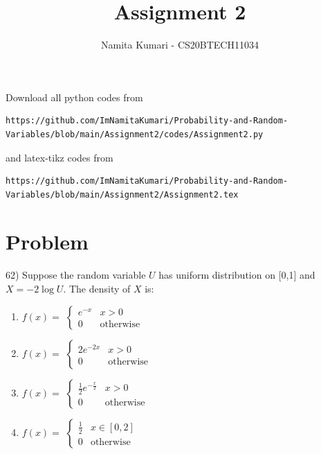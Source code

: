 \documentclass[journal,12pt,twocolumn]{IEEEtran}
\begin{document}
\makeatletter
{}
\makeatother
\let\StandardTheFigure\thefigure
\let\vec\mathbf
\renewcommand{\thefigure}{\theproblem}
\def\putbox#1#2#3{\makebox[0in][l]{\makebox[#1][l]{}\raisebox{\baselineskip}[0in][0in]{\raisebox{#2}[0in][0in]{#3}}}}
     \def\rightbox#1{\makebox[0in][r]{#1}}
     \def\centbox#1{\makebox[0in]{#1}}
     \def\topbox#1{\raisebox{-\baselineskip}[0in][0in]{#1}}
     \def\midbox#1{\raisebox{-0.5\baselineskip}[0in][0in]{#1}}
\vspace{3cm}
\title{Assignment 2}
\author{Namita Kumari - CS20BTECH11034}
\maketitle
\newpage
\bigskip
Download all python codes from 
\begin{lstlisting}
https://github.com/ImNamitaKumari/Probability-and-Random-Variables/blob/main/Assignment2/codes/Assignment2.py
\end{lstlisting}
%
and latex-tikz codes from 
%
\begin{lstlisting}
https://github.com/ImNamitaKumari/Probability-and-Random-Variables/blob/main/Assignment2/Assignment2.tex
\end{lstlisting}
\section{Problem}
62) Suppose the random variable $U$ has uniform distribution on [0,1] and $X=-2\log{U}$. The density of $X$ is:
\begin{enumerate}
\item $f(x)=$
$\begin{cases}
e^{-x} & x>0\\
0 & \mathrm{otherwise}
\end{cases}$

\item $f(x)=$
$\begin{cases}
2e^{-2x} & x>0\\
0 & \mathrm{otherwise}
\end{cases}$

\item $f(x)=$
$\begin{cases}
\frac{1}{2}e^{-\frac{x}{2}} & x>0\\
0 & \mathrm{otherwise}
\end{cases}$

\item $f(x)=$
$\begin{cases}
\frac{1}{2} & x\in [0,2]\\
0 & \mathrm{otherwise}
\end{cases}$
\end{enumerate}
\end{document}
